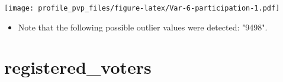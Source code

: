 \documentclass[
]{report}
\providecommand{\tightlist}{%
  \setlength{\itemsep}{0pt}\setlength{\parskip}{0pt}}
\begin{document}
\begin{minipage}{0.25 \textwidth}

\texttt{[image: profile\_pvp\_files/figure-latex/Var-6-participation-1.pdf]}

\end{minipage}

\begin{itemize}
\tightlist
\item
  Note that the following possible outlier values were detected: "9498".
\end{itemize}

\noindent\makebox[\linewidth]{\rule{\textwidth}{0.4pt}}

\hypertarget{registered_voters}{%
\section{registered\_voters}\label{registered_voters}}
\end{document}
